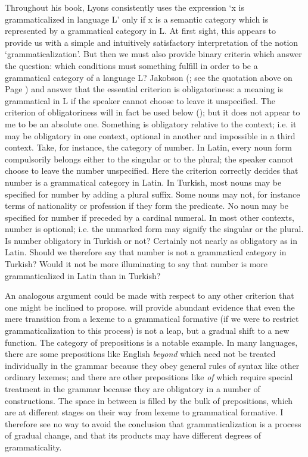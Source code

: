 Throughout his book, Lyons consistently uses the expression ‘x is grammaticalized in language L’ only if x is a semantic category which is represented by a grammatical category in L. At first sight, this appears to provide us with a simple and intuitively satisfactory interpretation of the notion ‘grammaticalization’. But then we must also provide binary criteria which answer the question: which conditions must something fulfill in order to be a grammatical category of a language L? Jakobson (\citeyear[489]{Jakobson1959}; see the quotation above on Page \pageref{quote:Jakobson}) and \citet[84]{Mel'čuk1976} answer that the essential criterion is obligatoriness: a meaning is grammatical in L if the speaker cannot choose to leave it unspecified. The criterion of obligatoriness will in fact be used below (); but it does not appear to me to be an absolute one. Something is obligatory relative to the context; i.e. it may be obligatory in one context, optional in another and impossible in a third context. Take, for instance, the category of number. In Latin, every noun form compulsorily belongs either to the singular or to the plural; the speaker cannot choose to leave the number unspecified. Here the criterion correctly decides that number is a grammatical category in Latin. In Turkish, most nouns may be specified for number by adding a plural suffix. Some nouns may not, for instance terms of nationality or profession if they form the predicate. No noun may be specified for number if preceded by a cardinal numeral. In most other contexts, number is optional; i.e. the unmarked form may signify the singular or the plural. Is number obligatory in Turkish or not? Certainly not nearly as obligatory as in Latin. Should we therefore say that number is not a grammatical category in Turkish? Would it not be more illuminating to say that number is more grammaticalized in Latin than in Turkish?

An analogous argument could be made with respect to any other criterion that one might be inclined to propose.  will provide abundant evidence that even the mere transition from a lexeme to a grammatical formative (if we were to restrict grammaticalization to this process) is not a leap, but a gradual shift to a new function. The category of prepositions is a notable example. In many languages, there are some prepositions like English \textit{beyond} which need not be treated individually in the grammar because they obey general rules of syntax like other ordinary lexemes; and there are other prepositions like \textit{of} which require special treatment in the grammar because they are obligatory in a number of constructions. The space in between is filled by the bulk of prepositions, which are at different stages on their way from lexeme to grammatical formative. I therefore see no way to avoid the conclusion that grammaticalization is a process of gradual change, and that its products may have different degrees of grammaticality.

